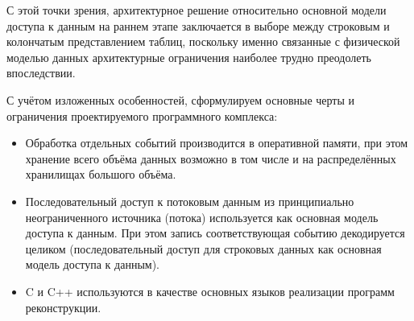 С этой точки зрения, архитектурное решение относительно основной модели
доступа к данным на раннем этапе заключается в выборе между строковым и
колончатым представлением таблиц, поскольку именно связанные с физической
моделью данных архитектурные  ограничения наиболее трудно преодолеть
впоследствии.


С учётом изложенных особенностей, сформулируем основные черты и ограничения
проектируемого программного комплекса:
\begin{itemize}
    \item Обработка отдельных событий производится в оперативной памяти,
    при этом хранение всего объёма данных возможно в том числе и на
    распределённых хранилищах большого объёма.
    \item Последовательный доступ к потоковым данным из принципиально
    неограниченного источника (потока) используется как основная модель
    доступа к данным. При этом запись соответствующая событию декодируется
    целиком (последовательный доступ для строковых данных как основная
    модель доступа к данным).
    \item C и C++ используются в качестве основных языков реализации
    программ реконструкции.
\end{itemize}

